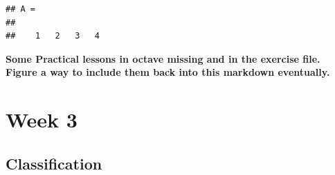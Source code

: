 \documentclass[
]{book}
\newenvironment{Shaded}{\begin{snugshade}}{\end{snugshade}}
\newcommand{\CommentTok}[1]{\textcolor[rgb]{0.56,0.35,0.01}{\textit{#1}}}
\newcommand{\FloatTok}[1]{\textcolor[rgb]{0.00,0.00,0.81}{#1}}
\newcommand{\NormalTok}[1]{#1}
\newcommand{\OperatorTok}[1]{\textcolor[rgb]{0.81,0.36,0.00}{\textbf{#1}}}
\begin{document}
\begin{Shaded}
\begin{Highlighting}[]
\CommentTok{%
\CommentTok{%
\CommentTok{%
\CommentTok{%
\CommentTok{%
\CommentTok{%
\CommentTok{%
\end{Highlighting}
\end{Shaded}

\begin{Shaded}
\begin{Highlighting}[]
\CommentTok{%
\CommentTok{%
\CommentTok{%
\CommentTok{%
\CommentTok{%
\CommentTok{%
\CommentTok{%
\end{Highlighting}
\end{Shaded}

\begin{Shaded}
\end{Shaded}

\begin{verbatim}
## A =
## 
##    1   2   3   4
\end{verbatim}

\textbf{Some Practical lessons in octave missing and in the exercise file. Figure a way to include them back into this markdown eventually.}

\hypertarget{week-3}{%
\chapter{Week 3}\label{week-3}}

\hypertarget{classification}{%
\section{Classification}\label{classification}}
\end{document}
